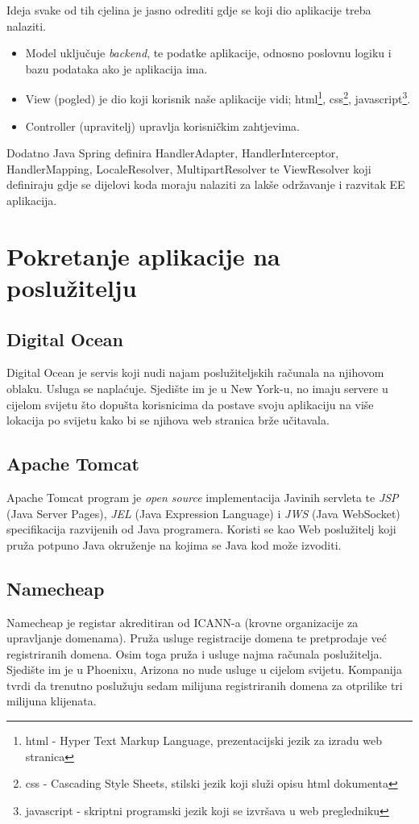 \documentclass[times, utf8, zavrsni, numeric]{fer}
\begin{document}
\noindent
Ideja svake od tih cjelina je jasno odrediti gdje se koji dio aplikacije treba nalaziti.
\begin{itemize}
				\item Model uključuje \textit{backend}\footnotemark{}, te podatke aplikacije, odnosno poslovnu logiku i bazu podataka ako je aplikacija ima.
	\item View (pogled) je dio koji korisnik naše aplikacije vidi; 
		html\footnote{html - Hyper Text Markup Language, prezentacijski jezik za izradu web stranica}, 
		css\footnote{css - Cascading Style Sheets, stilski jezik koji služi opisu html dokumenta}, 
		javascript\footnote{javascript - skriptni programski jezik koji se izvršava u web pregledniku}.
	\item Controller (upravitelj) upravlja korisničkim zahtjevima.
\end{itemize}
Dodatno Java Spring definira HandlerAdapter, HandlerInterceptor, HandlerMapping, LocaleResolver, MultipartResolver te ViewResolver koji definiraju gdje se dijelovi koda moraju nalaziti za lakše održavanje i razvitak EE\footnotemark{} aplikacija.

\section{Pokretanje aplikacije na poslužitelju}
\subsection{Digital Ocean}
\qquad Digital Ocean je servis koji nudi najam poslužiteljskih računala na njihovom oblaku.
Usluga se naplaćuje.
Sjedište im je u New York-u, no imaju servere u cijelom svijetu što dopušta korisnicima da postave svoju aplikaciju na više lokacija po svijetu kako bi se njihova web stranica brže učitavala.
\subsection{Apache Tomcat}
\qquad Apache Tomcat program je \textit{open source} implementacija Javinih servleta te \textit{JSP} (Java Server Pages), \textit{JEL} (Java Expression Language) i \textit{JWS} (Java WebSocket) specifikacija razvijenih od Java programera.
Koristi se kao Web poslužitelj koji pruža potpuno Java okruženje na kojima se Java kod može izvoditi.
\subsection{Namecheap}
\qquad Namecheap je registar akreditiran od ICANN-a (krovne organizacije za upravljanje domenama).
Pruža usluge registracije domena te pretprodaje već registriranih domena.
Osim toga pruža i usluge najma računala poslužitelja.
Sjedište im je u Phoenixu, Arizona no nude usluge u cijelom svijetu.
Kompanija tvrdi da trenutno poslužuju sedam milijuna registriranih domena za otprilike tri milijuna klijenata.
\end{document}

